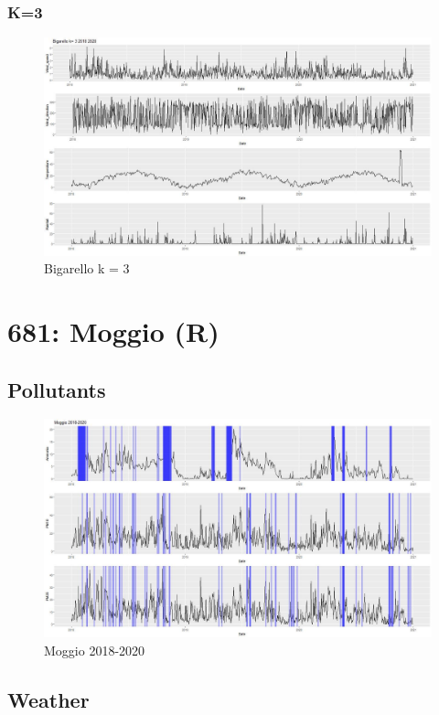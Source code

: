 \documentclass{article}
\begin{document}
\subsubsection{K=3}
\begin{figure}[H]
  \centering 
  \includegraphics[scale = 0.3]{Picture/3/Bigarello k= 3 2018 2020 .jpeg}
  \caption{Bigarello k = 3}
  \centering
\end{figure}

\section{681: Moggio (R)}
\subsection{Pollutants}
\begin{figure}[H]
  \centering
  \includegraphics[scale = 0.4]{Picture/Moggio 2018-2020.jpeg}
  \caption{Moggio 2018-2020}
  \centering
\end{figure}
\subsection{Weather}
\end{document}
